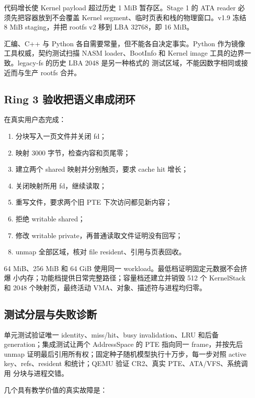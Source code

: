 代码增长使 Kernel payload 超过历史 1 MiB 暂存区。Stage 1 的 ATA reader
必须先把容器放到不会覆盖 Kernel segment、临时页表和栈的物理窗口。v1.9
冻结 8 MiB  staging，并把 rootfs v2 移到
LBA 32768，即 16 MiB。

汇编、C++ 与 Python 各自需要常量，但不能各自决定事实。Python
 作为镜像工具权威，契约测试扫描 NASM loader、BootInfo
和 Kernel image 工具的边界一致。legacy-fs 的历史 LBA 2048 是另一种格式的
测试区域，不能因数字相同或接近而与生产 rootfs 合并。

\subsection{Ring 3 验收把语义串成闭环}

 在真实用户态完成：

\begin{enumerate}[label=\arabic*.]
  \item 分块写入一页文件并关闭 fd；
  \item 映射 3000 字节，检查内容和页尾零；
  \item 建立两个 shared 映射并分别触页，要求 cache hit 增长；
  \item 关闭映射所用 fd，继续读取；
  \item 重写文件，要求两个旧 PTE 下次访问都见新内容；
  \item 拒绝 writable shared；
  \item 修改 writable private，再普通读取文件证明没有回写；
  \item unmap 全部区域，核对 file resident、引用与页表回收。
\end{enumerate}

64 MiB、256 MiB 和 64 GiB 使用同一 workload。最低档证明固定元数据不会挤爆
小内存；功能档提供日常完整路径；容量档还建立并销毁 512 个 KernelStack 和
2048 个映射页，最终活动 VMA、对象、描述符与进程均归零。

\subsection{测试分层与失败诊断}

单元测试验证唯一 identity、miss/hit、busy invalidation、LRU 和后备
generation；集成测试让两个 AddressSpace 的 PTE 指向同一 frame，并按先后
unmap 证明最后引用所有权；固定种子随机模型执行十万步，每一步对照 active
key、refs、resident 和统计；QEMU 验证 CR2、真实 PTE、ATA/VFS、系统调用
分块与进程交错。

几个具有教学价值的真实故障是：

